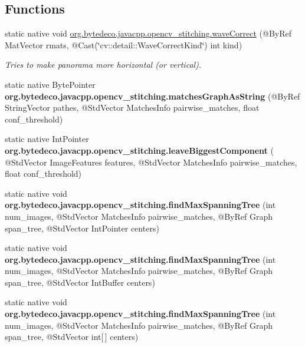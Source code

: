 \subsection*{Functions}
\begin{DoxyCompactItemize}
\item 
static native void \hyperlink{group__stitching__rotation_ga3bba1a4cfe47a38f2ef140a3bc6c0f0a}{org.\+bytedeco.\+javacpp.\+opencv\+\_\+stitching.\+wave\+Correct} (@By\+Ref Mat\+Vector rmats, @Cast(\char`\"{}cv\+::detail\+::\+Wave\+Correct\+Kind\char`\"{}) int kind)
\begin{DoxyCompactList}\small\item\em Tries to make panorama more horizontal (or vertical). \end{DoxyCompactList}\item 
\mbox{\label{group__stitching__rotation_gaf59145e19f75e6b8edfd6d5ff201b105}} 
static native Byte\+Pointer {\bfseries org.\+bytedeco.\+javacpp.\+opencv\+\_\+stitching.\+matches\+Graph\+As\+String} (@By\+Ref String\+Vector pathes, @Std\+Vector Matches\+Info pairwise\+\_\+matches, float conf\+\_\+threshold)
\item 
\mbox{\label{group__stitching__rotation_ga760b0ed1e8fbdca1c7460a416ba66f67}} 
static native Int\+Pointer {\bfseries org.\+bytedeco.\+javacpp.\+opencv\+\_\+stitching.\+leave\+Biggest\+Component} ( @Std\+Vector Image\+Features features, @Std\+Vector Matches\+Info pairwise\+\_\+matches, float conf\+\_\+threshold)
\item 
\mbox{\label{group__stitching__rotation_ga75940ac245f57bd5ddba8a98e3add77f}} 
static native void {\bfseries org.\+bytedeco.\+javacpp.\+opencv\+\_\+stitching.\+find\+Max\+Spanning\+Tree} (int num\+\_\+images, @Std\+Vector Matches\+Info pairwise\+\_\+matches, @By\+Ref Graph span\+\_\+tree, @Std\+Vector Int\+Pointer centers)
\item 
\mbox{\label{group__stitching__rotation_gaee2fa9577ddb5597f52168b779e47999}} 
static native void {\bfseries org.\+bytedeco.\+javacpp.\+opencv\+\_\+stitching.\+find\+Max\+Spanning\+Tree} (int num\+\_\+images, @Std\+Vector Matches\+Info pairwise\+\_\+matches, @By\+Ref Graph span\+\_\+tree, @Std\+Vector Int\+Buffer centers)
\item 
\mbox{\label{group__stitching__rotation_gacc151640cf63f2210ed175b4df01a79c}} 
static native void {\bfseries org.\+bytedeco.\+javacpp.\+opencv\+\_\+stitching.\+find\+Max\+Spanning\+Tree} (int num\+\_\+images, @Std\+Vector Matches\+Info pairwise\+\_\+matches, @By\+Ref Graph span\+\_\+tree, @Std\+Vector int\mbox{[}$\,$\mbox{]} centers)
\end{DoxyCompactItemize}
